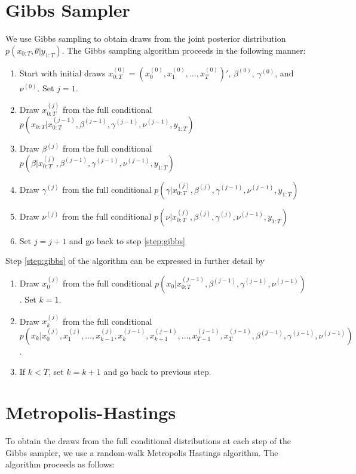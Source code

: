 \documentclass{article}
\begin{document}
\section{Gibbs Sampler} \label{sec:gibbs}

We use Gibbs sampling to obtain draws from the joint posterior distribution $p(x_{0:T},\theta|y_{1:T})$. The Gibbs sampling algorithm proceeds in the following manner:

\begin{enumerate}
\item Start with initial draws $x^{(0)}_{0:T} = (x^{(0)}_0,x^{(0)}_1,\ldots,x^{(0)}_T)'$, $\beta^{(0)}$, $\gamma^{(0)}$, and $\nu^{(0)}$. Set $j = 1$.
\item Draw $x^{(j)}_{0:T}$ from the full conditional $p(x_{0:T}|x^{(j-1)}_{0:T},\beta^{(j-1)},\gamma^{(j-1)},\nu^{(j-1)},y_{1:T})$ \label{step:gibbs}
\item Draw $\beta^{(j)}$ from the full conditional $p(\beta|x^{(j)}_{0:T},\beta^{(j-1)},\gamma^{(j-1)},\nu^{(j-1)},y_{1:T})$
\item Draw $\gamma^{(j)}$ from the full conditional $p(\gamma|x^{(j)}_{0:T},\beta^{(j)},\gamma^{(j-1)},\nu^{(j-1)},y_{1:T})$
\item Draw $\nu^{(j)}$ from the full conditional $p(\nu|x^{(j)}_{0:T},\beta^{(j)},\gamma^{(j)},\nu^{(j-1)},y_{1:T})$
\item Set $j = j + 1$ and go back to step \ref{step:gibbs}
\end{enumerate}

\noindent Step \ref{step:gibbs} of the algorithm can be expressed in further detail by

\begin{enumerate}[label=\alph*.,leftmargin=2.75\parindent]
\item Draw $x^{(j)}_0$ from the full conditional $p(x_0|x^{(j-1)}_{0:T},\beta^{(j-1)},\gamma^{(j-1)},\nu^{(j-1)})$. Set $k = 1$.
\item Draw $x^{(j)}_k$ from the full conditional \[p(x_k|x^{(j)}_0,x^{(j)}_1,\ldots,x^{(j)}_{k-1},x^{(j-1)}_k,x^{(j-1)}_{k+1},\ldots,x^{(j-1)}_{T-1},x^{(j-1)}_T,\beta^{(j-1)},\gamma^{(j-1)},\nu^{(j-1)})\].
\item If $k < T$, set $k = k + 1$ and go back to previous step.
\end{enumerate}

\section{Metropolis-Hastings}
To obtain the draws from the full conditional distributions at each step of the Gibbs sampler, we use a random-walk Metropolis Hastings algorithm. The algorithm proceeds as follows:
\end{document}
